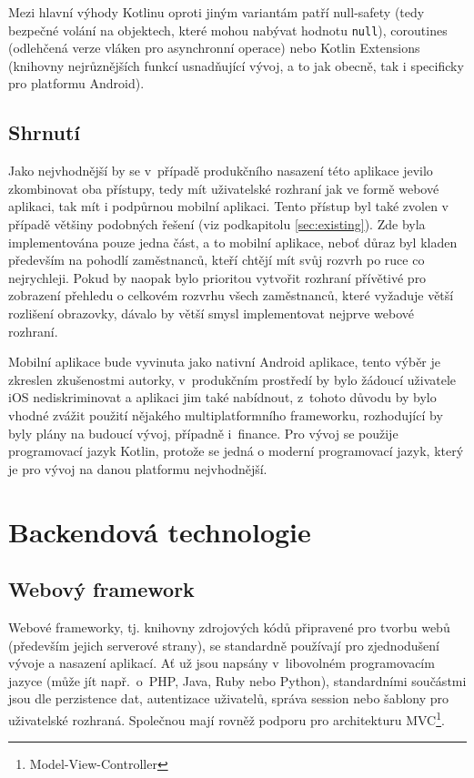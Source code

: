 \documentclass[twoside]{ctuthesis}
\begin{document}
Mezi hlavní výhody Kotlinu oproti jiným variantám patří null-safety (tedy bezpečné volání na objektech, které mohou nabývat hodnotu \texttt{null}), coroutines (odlehčená verze vláken pro asynchronní operace) nebo Kotlin Extensions (knihovny nejrůznějších funkcí usnadňující vývoj, a to jak obecně, tak i specificky pro platformu Android). \cite{android2021kotlin}


\subsection{Shrnutí}

Jako nejvhodnější by se v~případě produkčního nasazení této aplikace jevilo zkombinovat oba přístupy, tedy mít uživatelské rozhraní jak ve formě webové aplikaci, tak mít i podpůrnou mobilní aplikaci. Tento přístup byl také zvolen v případě většiny podobných řešení (viz podkapitolu \ref{sec:existing}). Zde byla implementována pouze jedna část, a to mobilní aplikace, neboť důraz byl kladen především na pohodlí zaměstnanců, kteří chtějí mít svůj rozvrh po ruce co nejrychleji. Pokud by naopak bylo prioritou vytvořit rozhraní přívětivé pro zobrazení přehledu o celkovém rozvrhu všech zaměstnanců, které vyžaduje větší rozlišení obrazovky, dávalo by větší smysl implementovat nejprve webové rozhraní.

Mobilní aplikace bude vyvinuta jako nativní Android aplikace, tento výběr je zkreslen zkušenostmi autorky, v~produkčním prostředí by bylo žádoucí uživatele iOS nediskriminovat a aplikaci jim také nabídnout, z~tohoto důvodu by bylo vhodné zvážit použití nějakého multiplatformního frameworku, rozhodující by byly plány na budoucí vývoj, případně i~finance. Pro vývoj se použije programovací jazyk Kotlin, protože se jedná o moderní programovací jazyk, který je pro vývoj na danou platformu nejvhodnější.


\section{Backendová technologie}

\subsection{Webový framework}

Webové frameworky, tj. knihovny zdrojových kódů připravené pro tvorbu webů (především jejich serverové strany), se standardně používají pro zjednodušení vývoje a nasazení aplikací. Ať už jsou napsány v~libovolném programovacím jazyce (může jít např.~o~PHP, Java, Ruby nebo Python), standardními součástmi jsou dle \cite{docforge2014web} perzistence dat, autentizace uživatelů, správa session nebo šablony pro uživatelské rozhraná. Společnou mají rovněž podporu pro architekturu MVC\footnote{Model-View-Controller}.
\end{document}
